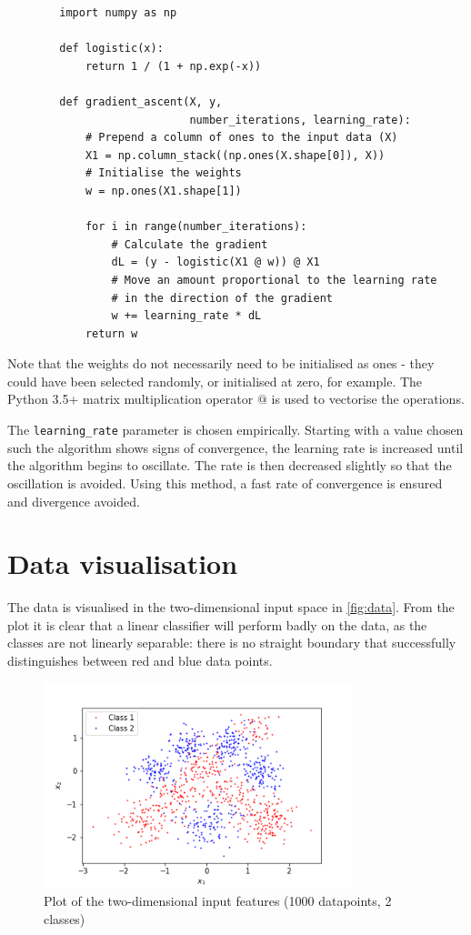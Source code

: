 \documentclass[a4paper]{article}
\begin{document}
    \begin{verbatim}
        import numpy as np

        def logistic(x):
            return 1 / (1 + np.exp(-x))

        def gradient_ascent(X, y,
                            number_iterations, learning_rate):
            # Prepend a column of ones to the input data (X)
            X1 = np.column_stack((np.ones(X.shape[0]), X))
            # Initialise the weights
            w = np.ones(X1.shape[1])

            for i in range(number_iterations):
                # Calculate the gradient
                dL = (y - logistic(X1 @ w)) @ X1
                # Move an amount proportional to the learning rate
                # in the direction of the gradient
                w += learning_rate * dL
            return w
    \end{verbatim}

    Note that the weights do not necessarily need to be initialised as ones - they could have been selected randomly, or
    initialised at zero, for example. The Python 3.5+ matrix multiplication operator $@$ is used to vectorise the
    operations.

    The \verb`learning_rate` parameter is chosen empirically. Starting with a value chosen such the algorithm shows signs
    of convergence, the learning rate is increased until the algorithm begins to oscillate. The rate is then decreased
    slightly so that the oscillation is avoided. Using this method, a fast rate of convergence is ensured and divergence
    avoided.

    \section{Data visualisation}\label{sec:data-visualisation}
    The data is visualised in the two-dimensional input space in \autoref{fig:data}. From the plot it is clear that a
    linear classifier will perform badly on the data, as the classes are not linearly separable: there is no straight
    boundary that successfully distinguishes between red and blue data points.

    \begin{figure}[h]
        \label{fig:data}
        \centering
        \includegraphics[width=0.8\textwidth]{plots/data.png}
        \caption{Plot of the two-dimensional input features (1000 datapoints, 2 classes)}
    \end{figure}
\end{document}
